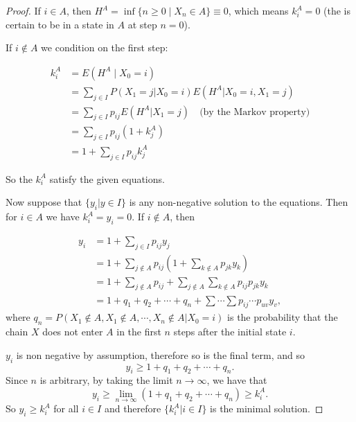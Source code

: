 \documentclass[12pt]{article}
\begin{document}
\begin{proof}

If $i\in A$, then $H^A=\inf\lbrace n\ge 0\mid X_n\in A\rbrace \equiv 0$, which means $k_i^A = 0$ (the  is certain to be in a state in $A$ at step $n=0$).

If $i\notin A$ we condition on the first step:

\begin{align*}
k_i^A & = E(H^A \mid X_0 = i) \\
& = \sum_{j \in I} P(X_1 = j | X_0 = i) E(H^A | X_0 = i, X_1 = j) \\
& = \sum_{j \in I} p_{ij} E(H^A | X_1 = j) \quad \textrm{(by the Markov property)}\\
& = \sum_{j \in I} p_{ij} (1 + k_j^A)\\
& = 1 + \sum_{j \in I} p_{ij} k_j^A
\end{align*}

So the $k_i^A$ satisfy the given equations. 

Now suppose that $\{y_i | y \in I\}$ is any non-negative solution to the equations. Then for $i \in A$ we have $k_i^A = y_i = 0$.  If $i \notin A$, then

\begin{align*}
y_i & = 1 + \sum_{j \in I} p_{ij}y_j \\
& = 1 + \sum_{j \notin A} p_{ij}(1 + \sum_{k \notin A} p_{jk} y_k) \\
& = 1 + \sum_{j \notin A} p_{ij} + \sum_{j \notin A} \sum_{k \notin A} p_{ij} p_{jk} y_k \\
& = 1 + q_1 + q_2 + \cdots + q_n + \sum \cdots \sum p_{ij} \cdots p_{uv}y_v,
\end{align*}
where $q_n = P(X_1 \notin A, X_1 \notin A, \cdots, X_n \notin A | X_0 =i)$ is the probability that the chain $X$ does not enter $A$ in the first $n$ steps after the initial state $i$.

$y_i$ is non negative by assumption, therefore so is the final term, and so
$$y_i \geq 1 + q_1 + q_2 + \cdots + q_n.$$
Since $n$ is arbitrary, by taking the limit $n\to \infty$, we have that 
$$y_i \geq \lim_{n \to \infty} (1 + q_1 + q_2 + \cdots + q_n) \geq k_i^A.$$
So $y_i \geq k_i^A$ for all $i \in I$ and therefore $\{k_i^A | i \in I \}$ is the minimal solution.
\end{proof}
\end{document}
